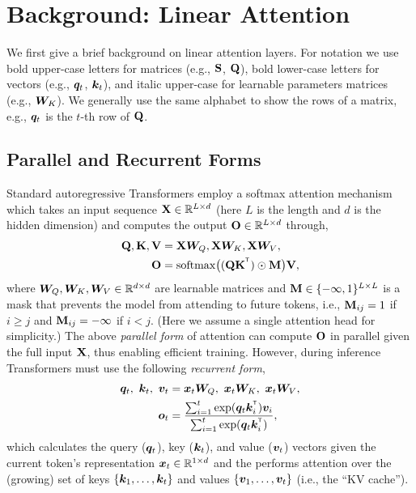 \vspace{-3mm}
\section{Background: Linear Attention}
\vspace{-3mm}
We first give a brief background on linear attention layers. For notation we  use bold upper-case letters for matrices (e.g., ${\mathbf{S}}$, ${\mathbf{Q}}$),  bold lower-case letters  for vectors (e.g., ${\bm{q}}_t$, ${\bm{k}}_t$), and italic upper-case  for learnable parameters matrices (e.g., ${\bm{W}}_K$). We generally use the same alphabet to show the rows of a matrix, e.g., ${\bm{q}}_t$ is the $t$-th row of ${\mathbf{Q}}$.

\label{sec:background}
\vspace{-2mm}
\subsection{Parallel and Recurrent Forms}
\vspace{-2mm}
\label{subsec:background-lin}
Standard autoregressive Transformers employ a softmax attention mechanism which takes an input sequence ${\mathbf{X}} \in \mathbb{R}^{L \times d}$ (here $L$ is the length and $d$ is the hidden dimension) and computes the output ${\mathbf{O}} \in \mathbb{R}^{L \times d}$ through,
\begin{align*}
\rmQ, \rmK, \rmV &= \rmX \mW_Q, \rmX \mW_K, \rmX \mW_V, \\  \rmO &= \softmax\big((\rmQ \rmK^\intercal) \odot \rmM \big) \rmV,
%
\end{align*}
%
where ${\bm{W}}_Q, {\bm{W}}_K, {\bm{W}}_V \in \mathbb{R}^{d \times d}$ are learnable matrices and 
${\mathbf{M}} \in \{-\infty,1\}^{L \times L}$ is a mask that prevents the model from attending to  future tokens, i.e., ${\mathbf{M}}_{ij}=1$ if $i\ge j$ and ${\mathbf{M}}_{ij}=-\infty$ if $i<j$. (Here we assume a single attention head for simplicity.) 
The above \textit{parallel form} of attention can compute ${\mathbf{O}}$ in parallel given the full input ${\mathbf{X}}$, thus enabling efficient training. However, during inference Transformers must use the following \emph{recurrent form},
\begin{align*}
\vq_t, \ \vk_t, \ \vv_t &= \vx_t \mW_Q, \  \vx_t \mW_K, \ \vx_t \mW_V, \\ \vo_t &= \frac{\sum_{i=1}^{t} \exp(\vq_t  \vk_i^\intercal)\vv_i}{\sum_{i =1} ^{t} \exp(\vq_t  \vk_i^\intercal)},
\end{align*}
which calculates the query (${\bm{q}}_t$), key (${\bm{k}}_t$), and value (${\bm{v}}_t$) vectors given the current token's representation ${\bm{x}}_t \in \mathbb{R}^{1 \times d}$ and the performs attention over the (growing) set of keys $\{{\bm{k}}_1, \dots, {\bm{k}}_t\}$ and values   $\{{\bm{v}}_1, \dots, {\bm{v}}_t\}$ (i.e., the ``KV cache''). 

